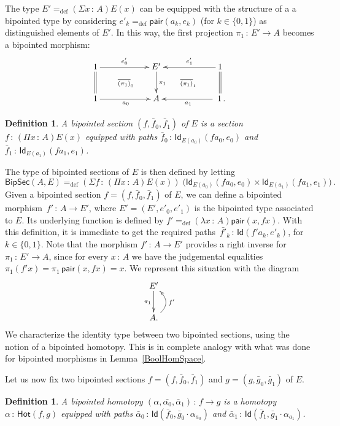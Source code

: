\documentclass[10pt,a4paper,oneside,reqno]{amsart}
\numberwithin{equation}{section}
\theoremstyle{mythm}
\theoremstyle{mydef}
\newtheorem{definition}[theorem]{Definition}
\theoremstyle{myrmk}
\newcommand{\deq}{=}
\newcommand{\defeq}{=_{\mathrm{def}}}
\newcommand{\co}{\,{:}\,}
\newcommand{\ct}{\cdot}
\newcommand{\Hot}{\mathsf{Hot}}
\newcommand{\Id}{\mathsf{Id}}
\newcommand{\pair}{\mathsf{pair}}
\newcommand{\BipSec}{\mathsf{BipSec}}
\begin{document}
The type
$E'  \defeq (\Sigma x \co A) E(x)$ can be equipped with the structure of
a a bipointed type by considering $e'_k \defeq \pair(a_k, e_k)$ 
(for $k \in \{ 0, 1 \}$) as distinguished elements of $E'$. In this way, the first projection $\pi_1 \co E' \to A$ becomes a bipointed morphism:
\[
\xymatrix@C=2cm{
1  \ar[r]^-{e'_0} \ar@{=}[d] \ar@{}[dr]|{\overline{(\pi_1)}_0} & E' \ar[d]^{\pi_1} & 1 \ar[l]_-{e'_1} \ar@{=}[d]
\ar@{}[dl]|{\overline{(\pi_1)}_1}   \\ 
 1 \ar[r]_{a_0} & A  & \; 1 \, . \ar[l]^{a_1} }
 \]



\begin{definition} \label{def:fibsection} A \emph{bipointed section} $(f, \bar{f}_0, \bar{f}_1)$ of $E$
is a section $f \co (\Pi x \co A) E(x)$ equipped with paths $\bar{f}_0 \co \Id_{E(a_0)}(f a_0, e_0)$ 
and $\bar{f}_1 \co  \Id_{E(a_1)}( f a_1 , e_1)$. 
\end{definition} 


The type of bipointed sections of $E$ is then defined by letting
\[
\BipSec(A,E) \defeq (\Sigma f \co (\Pi x \co A)E(x) ) \; \big(
  \Id_{E(a_0)}(f a_0,  e_0)  \times \Id_{E(a_1)}( fa_1, e_1)  \big) \, .
\]
Given a bipointed section $f = (f, \bar{f}_0, \bar{f}_1)$ of $E$, we can define a bipointed morphism~$f'  \co A \to E'$, where $E' =
(E', e'_0, e'_1)$ is  the bipointed type associated to $E$. Its underlying function is defined
by $f' \defeq (\lambda x \co A) \pair(x, fx)$. With this definition, it is 
immediate to get the required paths~$\bar{f'}_k \co \Id( f' a_k ,  e'_k)$, for $k \in \{ 0, 1\}$. Note that
the morphism $f' \co A \to E'$ provides a  right inverse for~$\pi_1 \co E' \to A$,
 since for every $x \co A$ we have the judgemental equalities $\pi_1 (f' x) \deq \pi_1\, \pair(x, f x) \deq x$.
 We represent this situation with the diagram
\[
\xymatrix{
E' \ar[d]_{\pi_1} \\
A . \ar@/_1.2pc/[u]_{f'} }
\]
We characterize the identity type between two bipointed sections, using
the notion of a bipointed homotopy. This is in complete analogy with what was done
for bipointed morphisms  in Lemma~\ref{BoolHomSpace}. 

\medskip

Let us now fix two bipointed sections $f = (f, \bar{f}_0,\bar{f}_1)$ and $g = (g, \bar{g}_0, \bar{g}_1)$  of $E$.

\begin{definition} \label{def:2cellsection} A \emph{bipointed homotopy}  $(\alpha, \bar{\alpha_0},
\bar{\alpha}_1) \co f \to g$ is  a homotopy~$\alpha \co \Hot(f, g)$ equipped with paths $\bar{\alpha}_0 \co \Id(  \bar{f}_0 ,  \bar{g}_0 \ct \alpha_{a_0}  )$ and $\bar{\alpha}_1 \co \Id(
\bar{f}_1 , \bar{g}_1 \ct  \alpha_{a_1})$.
\end{definition} 
\end{document}
